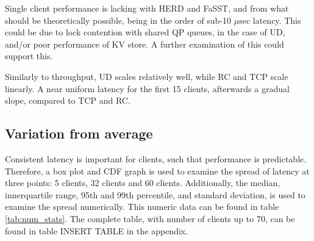 Single client performance is lacking with HERD\cite{kalia2014using} and FaSST\cite{kalia2016fasst}, and from what should be theoretically possible, being in the order of sub-10 $\mu$sec latency.
This could be due to lock contention with shared QP queues, in the case of UD, and/or poor performance of KV store.
A further examination of this could support this.

Similarly to throughput, UD scales relatively well, while RC and TCP scale linearly.
A near uniform latency for the first 15 clients, afterwards a gradual slope, compared to TCP and RC.





\subsection{Variation from average}
Consistent latency is important for clients, such that performance is predictable.
Therefore, a box plot and CDF graph is used to examine the spread of latency at three points: 5 clients, 32 clients and 60 clients.
Additionally, the median, innerquartile range, 95th and 99th percentile, and standard deviation, is used to examine the spread numerically.
This numeric data can be found in table \ref{tab:num_stats}.
The complete table, with number of clients up to 70, can be found in table INSERT TABLE in the appendix.
